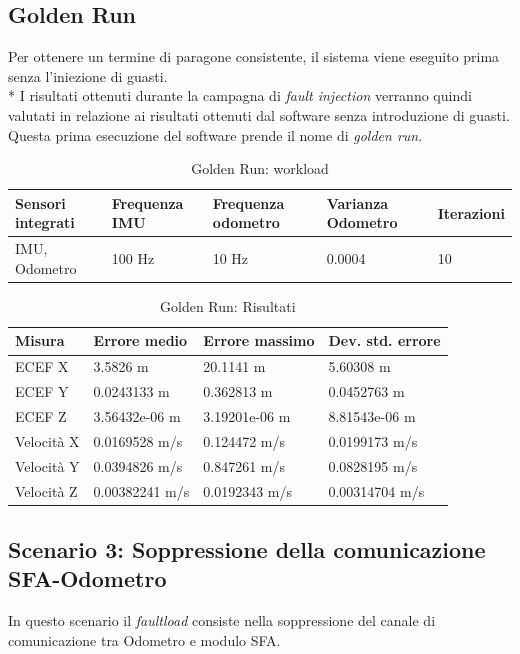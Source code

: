 \subsection{Golden Run}
Per ottenere un termine di paragone consistente, il sistema viene eseguito prima senza l'iniezione di guasti.\\*
I risultati ottenuti durante la campagna di \emph{fault injection} verranno quindi valutati in relazione ai risultati ottenuti dal software senza introduzione di guasti. Questa prima esecuzione del software prende il nome di \emph{golden run}.
\begin{table}[h]
	\centering
	\begin{tabular}{|p{3.25cm}|p{2cm}|p{2cm}|p{2cm}|p{2cm}|}
		\hline 
		\textbf{Sensori integrati} & \textbf{Frequenza IMU}  & \textbf{Frequenza odometro} & \textbf{Varianza Odometro} & \textbf{Iterazioni} \\ 
		\hline 
		IMU, Odometro & 100 Hz & 10 Hz & 0.0004 & 10 \\
		\hline 
	\end{tabular}
	\caption{Golden Run: workload}
	\label{tab:exp12}
\end{table}
\begin{table}[h]
	\centering
	\begin{tabular}{|p{2cm}|p{3cm}|p{3cm}|p{3cm}|}
		\hline 
		\textbf{Misura} & \textbf{Errore medio}  & \textbf{Errore massimo} & \textbf{Dev. std. errore}\\ 
		\hline 
		ECEF X & 3.5826 m & 20.1141 m & 5.60308 m \\ 
		\hline 
		ECEF Y & 0.0243133 m & 0.362813 m & 0.0452763 m \\ 
		\hline 
		ECEF Z & 3.56432e-06 m & 3.19201e-06 m & 8.81543e-06 m \\ 
		\hline 
		Velocit\`a X & 0.0169528 m/s & 0.124472 m/s & 0.0199173 m/s \\ 
		\hline 
		Velocit\`a Y & 0.0394826 m/s & 0.847261 m/s & 0.0828195 m/s \\ 
		\hline 
		Velocit\`a Z & 0.00382241 m/s & 0.0192343 m/s & 0.00314704 m/s \\ 
		\hline 
	\end{tabular}
	\caption{Golden Run: Risultati}
	\label{tab:exp12res}
\end{table}
\FloatBarrier
\subsection{Scenario 3: Soppressione della comunicazione SFA-Odometro}
In questo scenario il \emph{faultload} consiste nella soppressione del canale di comunicazione tra Odometro e modulo SFA.

